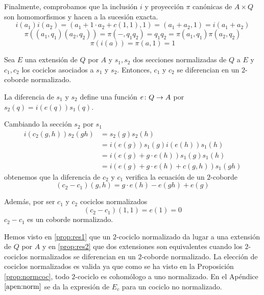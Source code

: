 \begin{proposicion}
\begin{demostracion}
	Finalmente, comprobamos que la inclusión $i$ y proyección $\pi$ canónicas de $A\times Q$ son homomorfismos y hacen a la sucesión exacta.
	\begin{equation*}
		i(a_1)i(a_2)=(a_1 + 1 \cdot a_2+c(1,1),1) = (a_1+a_2,1)=i(a_1+a_2)
	\end{equation*}
	\begin{equation*}
		\pi((a_1,q_1)(a_2,q_2))=\pi(-,q_1q_2) = q_1q_2 = \pi(a_1,q_1)\pi(a_2,q_2)
	\end{equation*}
	\begin{equation*}
		\pi(i(a)) = \pi(a,1) = 1
	\end{equation*}
	\end{demostracion}
\end{proposicion}

\begin{proposicion}\label{prop:res2}
	Sea $E$ una extensión de $Q$ por $A$ y $s_1,s_2$ dos secciones normalizadas de $Q$ a $E$ y $c_1,c_2$ los cociclos asociados a $s_1$ y $s_2$. Entonces, $c_1$ y $c_2$ se diferencian en un $2$-coborde normalizado. %
	
	\begin{demostracion}
		La diferencia de $s_1$ y $s_2$ define una función $e\colon Q\to A$ por $s_2(q) = i(e(q))s_1(q)$.
		
		Cambiando la sección $s_2$ por $s_1$
		\begin{align*}
			i(c_2(g,h))s_2(gh) &= s_2(g)s_2(h) \\ &= i(e(g))s_1(g)i(e(h))s_1(h)\\ &= i(e(g) + g \cdot e(h)) s_1(g)s_1(h) \\ &= i(e(g) + g \cdot e(h) + c(g,h))s_1(gh)
		\end{align*}
		obtenemos que la diferencia de $c_2$ y $c_1$ verifica la ecuación de un $2$-coborde
		\begin{equation} 
			(c_2-c_1)(g,h) = g \cdot e(h) - e(gh) + e(g)
		\end{equation}
		
		Además, por ser $c_1$ y $c_2$ cociclos normalizados
		\begin{equation*}
			(c_2-c_1)(1,1) = e(1) = 0
		\end{equation*}
		$c_2-c_1$ es un coborde normalizado.
	\end{demostracion}
\end{proposicion}

Hemos visto en \ref{prop:res1} que un $2$-cociclo normalizado da lugar a una extensión de $Q$ por $A$ y en \ref{prop:res2} que dos extensiones son equivalentes cuando los $2$-cociclos normalizados se diferencian en un $2$-coborde normalizado. La elección de cociclos normalizados es valida ya que como se ha visto en la Proposición \ref{prop:normcoc}, todo $2$-cociclo es cohomólogo a uno normalizado. En el Apéndice $\ref{apen:norm}$ se da la expresión de $E_c$ para un cociclo no normalizado.

